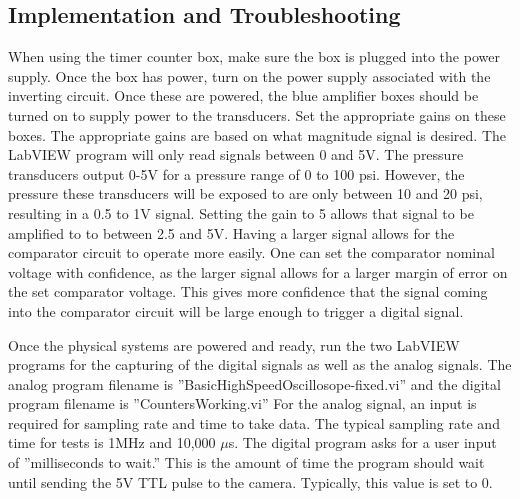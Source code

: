 
\subsection{Implementation and Troubleshooting}

When using the timer counter box, make sure the box is plugged into the power supply. Once the box has power, turn on the power supply associated with the inverting circuit. Once these are powered, the blue amplifier boxes should be turned on to supply power to the transducers. Set the appropriate gains on these boxes. The appropriate gains are based on what magnitude signal is desired. The LabVIEW program will only read signals between 0 and 5V. The pressure transducers output 0-5V for a pressure range of 0 to 100 psi. However, the pressure these transducers will be exposed to are only between 10 and 20 psi, resulting in a 0.5 to 1V signal. Setting the gain to 5 allows that signal to be amplified to to between 2.5 and 5V. Having a larger signal allows for the comparator circuit to operate more easily. One can set the comparator nominal voltage with confidence, as the larger signal allows for a larger margin of error on the set comparator voltage. This gives more confidence that the signal coming into the comparator circuit will be large enough to trigger a digital signal. 

Once the physical systems are powered and ready, run the two LabVIEW programs for the capturing of the digital signals as well as the analog signals. The analog program filename is ''BasicHighSpeedOscillosope-fixed.vi'' and the digital program filename is ''CountersWorking.vi'' For the analog signal, an input is required for sampling rate and time to take data. The typical sampling rate and time for tests is 1MHz and 10,000 $\mu$s. The digital program asks for a user input of ''milliseconds to wait.'' This is the amount of time the program should wait until sending the 5V TTL pulse to the camera. Typically, this value is set to 0. 

